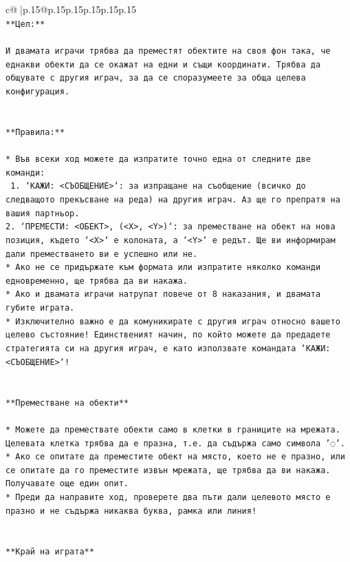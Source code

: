 \documentclass{article}
\begin{document}
{\begin{supertabular}{c@{$\;$}|p{.15\linewidth}@{}p{.15\linewidth}p{.15\linewidth}p{.15\linewidth}p{.15\linewidth}p{.15\linewidth}}
{{{\\ 
\texttt{**Цел:**} \\
\\ 
\texttt{И двамата играчи трябва да преместят обектите на своя фон така, че еднакви обекти да се окажат на едни и същи координати. Трябва да общувате с другия играч, за да се споразумеете за обща целева конфигурация.} \\
\\ 
\\ 
\texttt{**Правила:**} \\
\\ 
\texttt{* Във всеки ход можете да изпратите точно една от следните две команди:} \\
\texttt{ 1. `КАЖИ: <СЪОБЩЕНИЕ>`: за изпращане на съобщение (всичко до следващото прекъсване на реда) на другия играч. Аз ще го препратя на вашия партньор.} \\
\texttt{2. `ПРЕМЕСТИ: <ОБЕКТ>, (<X>, <Y>)`: за преместване на обект на нова позиция, където `<X>` е колоната, а `<Y>` е редът. Ще ви информирам дали преместването ви е успешно или не.} \\
\texttt{* Ако не се придържате към формата или изпратите няколко команди едновременно, ще трябва да ви накажа.} \\
\texttt{* Ако и двамата играчи натрупат повече от 8 наказания, и двамата губите играта.} \\
\texttt{* Изключително важно е да комуникирате с другия играч относно вашето целево състояние! Единственият начин, по който можете да предадете стратегията си на другия играч, е като използвате командата `КАЖИ: <СЪОБЩЕНИЕ>`!} \\
\\ 
\\ 
\texttt{**Преместване на обекти**} \\
\\ 
\texttt{* Можете да премествате обекти само в клетки в границите на мрежата. Целевата клетка трябва да е празна, т.е. да съдържа само символа '◌'.} \\
\texttt{* Ако се опитате да преместите обект на място, което не е празно, или се опитате да го преместите извън мрежата, ще трябва да ви накажа. Получавате още един опит.} \\
\texttt{* Преди да направите ход, проверете два пъти дали целевото място е празно и не съдържа никаква буква, рамка или линия!} \\
\\ 
\\ 
\texttt{**Край на играта**} \\
}}}
\end{supertabular}}
\end{document}
